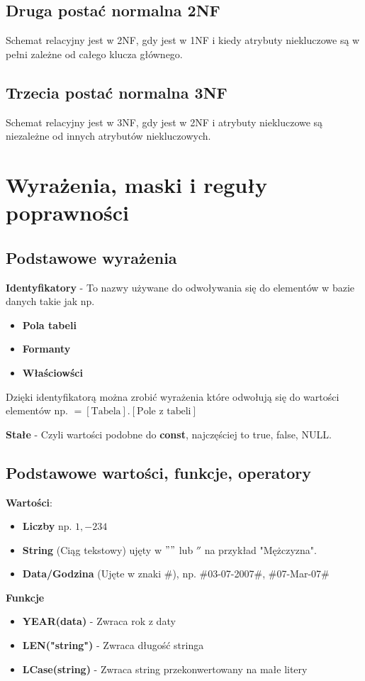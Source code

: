 \documentclass[12pt, a4paper]{article}
\begin{document}
\subsection*{Druga postać normalna 2NF}
Schemat relacyjny jest w 2NF, gdy jest w 1NF i kiedy atrybuty niekluczowe są
w pełni zależne od całego klucza głównego.
\subsection*{Trzecia postać normalna 3NF}
Schemat relacyjny jest w 3NF, gdy jest w 2NF i atrybuty niekluczowe są niezależne od innych
atrybutów niekluczowych.
\section{Wyrażenia, maski i reguły poprawności}
\subsection*{Podstawowe wyrażenia}
\textbf{Identyfikatory} - To nazwy używane do odwoływania się do elementów w bazie danych takie jak np.
\begin{itemize}
  \item \textbf{Pola tabeli}
  \item \textbf{Formanty}
  \item \textbf{Właściowści}
\end{itemize}
Dzięki identyfikatorą można zrobić wyrażenia które odwołują się do wartości elementów np.
$= [\text{Tabela}].[\text{Pole z tabeli}]$
\vspace{1em}

\textbf{Stałe} - Czyli wartości podobne do \textbf{const}, najczęściej to true, false, NULL.
\subsection*{Podstawowe wartości, funkcje, operatory}
\textbf{Wartości}:
\begin{itemize}
  \item \textbf{Liczby} np. $1, -234$
  \item \textbf{String} (Ciąg tekstowy) ujęty w $""$ lub $''$ na przykład "Mężczyzna".
  \item \textbf{Data/Godzina} (Ujęte w znaki \#), np. \#03-07-2007\#, \#07-Mar-07\#
\end{itemize}
\vspace{1em}

\textbf{Funkcje}
\begin{itemize}
  \item \textbf{YEAR(data)} - Zwraca rok z daty
  \item \textbf{LEN("string")} - Zwraca długość stringa
  \item \textbf{LCase(string)} - Zwraca string przekonwertowany na małe litery
\end{itemize}
\vspace{1em}
\end{document}
